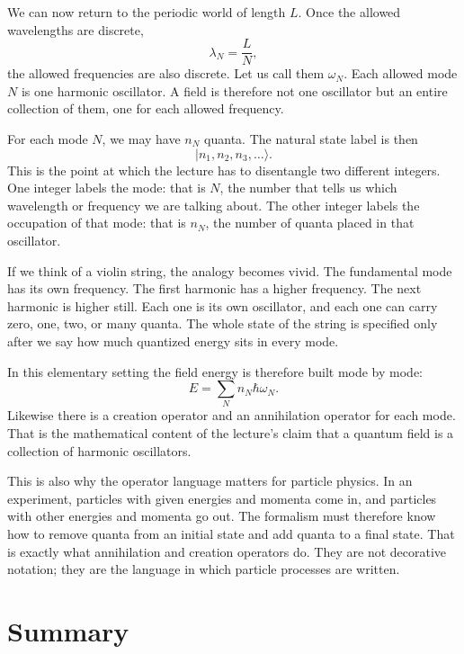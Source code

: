 We can now return to the periodic world of length \(L\). Once the allowed wavelengths are discrete,
\begin{equation}
\lambda_N=\frac{L}{N},
\end{equation}
the allowed frequencies are also discrete. Let us call them \(\omega_N\). Each allowed mode \(N\) is one harmonic oscillator. A field is therefore not one oscillator but an entire collection of them, one for each allowed frequency.

For each mode \(N\), we may have \(n_N\) quanta. The natural state label is then
\begin{equation}
|n_1,n_2,n_3,\dots\rangle.
\end{equation}
This is the point at which the lecture has to disentangle two different integers. One integer labels the mode: that is \(N\), the number that tells us which wavelength or frequency we are talking about. The other integer labels the occupation of that mode: that is \(n_N\), the number of quanta placed in that oscillator.

If we think of a violin string, the analogy becomes vivid. The fundamental mode has its own frequency. The first harmonic has a higher frequency. The next harmonic is higher still. Each one is its own oscillator, and each one can carry zero, one, two, or many quanta. The whole state of the string is specified only after we say how much quantized energy sits in every mode.

In this elementary setting the field energy is therefore built mode by mode:
\begin{equation}
E=\sum_{N} n_N \hbar \omega_N.
\end{equation}
Likewise there is a creation operator and an annihilation operator for each mode. That is the mathematical content of the lecture's claim that a quantum field is a collection of harmonic oscillators.

This is also why the operator language matters for particle physics. In an experiment, particles with given energies and momenta come in, and particles with other energies and momenta go out. The formalism must therefore know how to remove quanta from an initial state and add quanta to a final state. That is exactly what annihilation and creation operators do. They are not decorative notation; they are the language in which particle processes are written.

\section{Summary}

